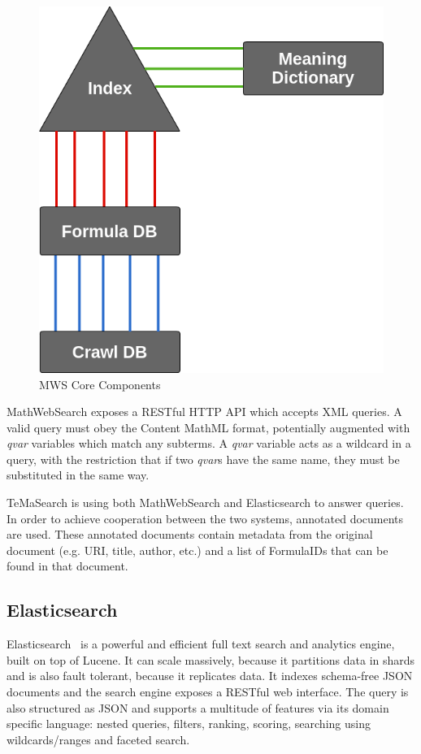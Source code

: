 \documentclass[a4paper,oneside]{article}
\def\mws{\textsf{MathWebSearch}\xspace}
\def\tms{\textsf{TeMaSearch}\xspace}
\def\els{\textsf{Elasticsearch}\xspace}
\def\cmml{\textsf{Content MathML}\xspace}
\def\xml{\textsf{XML}\xspace}
\begin{document}
\begin{figure}[ht]\centering
\includegraphics[scale=0.3]{img/simple_index.png}
\caption{MWS Core Components}\label{fig:simple_index}
\end{figure}
\FloatBarrier

\mws exposes a RESTful HTTP API which accepts \xml queries.
A valid query must obey the \cmml format, potentially augmented with
\emph{qvar} variables which match any subterms.  A \emph{qvar} variable acts as
a wildcard in a query, with the restriction that if two \emph{qvar}s have the
same name, they must be substituted in the same way.

\tms is using both \mws and \els to answer queries.
In order to achieve cooperation between the two systems, annotated documents
are used. These annotated documents contain metadata from the original document
(e.g. URI, title, author, etc.) and a list of \textsf{FormulaID}s that can be
found in that document.

\subsection{Elasticsearch}\label{subsec:prelim:els}
Elasticsearch~\cite{esl:online} is a powerful and efficient full text search
and analytics engine, built on top of Lucene. It can scale massively, because
it partitions data in shards and is also fault tolerant, because it replicates
data.  It indexes schema-free JSON documents and the search engine exposes a
RESTful web interface.  The query is also structured as JSON and supports a
multitude of features via its domain specific language:  nested queries,
filters, ranking, scoring, searching using wildcards/ranges and faceted search.
\end{document}
